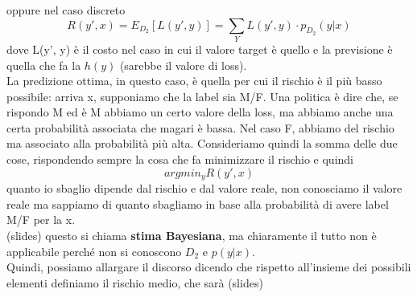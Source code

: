 \documentclass[12pt, oneside]{extbook}
\begin{document}
oppure nel caso discreto
\begin{equation}
	R(y', x) = E_ {D_2}[L(y', y)] = \sum\limits_{Y} L(y', y) \cdot p_{D_2}(y|x)
\end{equation}	
dove L(y', y) è il costo nel caso in cui il valore target è quello e la previsione è quella che fa la $h(y)$ (sarebbe il valore di loss).\\La predizione ottima, in questo caso, è quella per cui il rischio è il più basso possibile: arriva x, supponiamo che la label sia M/F. Una politica è dire che, se rispondo M ed è M abbiamo un certo valore della loss, ma abbiamo anche una certa probabilità associata che magari è bassa. Nel caso F, abbiamo del rischio ma associato alla probabilità più alta. Consideriamo quindi la somma delle due cose, rispondendo sempre la cosa che fa minimizzare il rischio e quindi 
\begin{equation}
	argmin_{y} R(y', x)
\end{equation}
quanto io sbaglio dipende dal rischio e dal valore reale, non conosciamo il valore reale ma sappiamo di quanto sbagliamo in base alla probabilità di avere label M/F per la x.\\(slides) questo si chiama \textbf{stima Bayesiana}, ma chiaramente il tutto non è applicabile perché non si conoscono $D_2$ e $p(y|x)$.\\Quindi, possiamo allargare il discorso dicendo che rispetto all'insieme dei possibili elementi definiamo il rischio medio, che sarà (slides)
\end{document}

